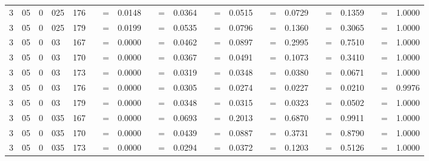 \begin{tabular*}{260mm}{r@{.}lr@{.}lc|ccc:ccc:ccc:ccc:ccc|ccc}
		3&05	&	0&025	&	176	&	 &=& 0.0148 & 	 &=& 0.0364 & 	 &=& 0.0515 & 	 &=& 0.0729 & 	 &=& 0.1359 & 	 &=& 1.0000 \\ 
		3&05	&	0&025	&	179	&	 &=& 0.0199 & 	 &=& 0.0535 & 	 &=& 0.0796 & 	 &=& 0.1360 & 	 &=& 0.3065 & 	 &=& 1.0000 \\ 
		3&05	&	0&03	&	167	&	\nicefrac{}{} &=& 0.0000 & 	 &=& 0.0462 & 	 &=& 0.0897 & 	 &=& 0.2995 & 	 &=& 0.7510 & 	 &=& 1.0000 \\ 
		3&05	&	0&03	&	170	&	\nicefrac{}{} &=& 0.0000 & 	 &=& 0.0367 & 	 &=& 0.0491 & 	 &=& 0.1073 & 	 &=& 0.3410 & 	 &=& 1.0000 \\ 
		3&05	&	0&03	&	173	&	\nicefrac{}{} &=& 0.0000 & 	 &=& 0.0319 & 	 &=& 0.0348 & 	 &=& 0.0380 & 	 &=& 0.0671 & 	 &=& 1.0000 \\ 
		3&05	&	0&03	&	176	&	\nicefrac{}{} &=& 0.0000 & 	 &=& 0.0305 & 	 &=& 0.0274 & 	 &=& 0.0227 & 	 &=& 0.0210 & 	 &=& 0.9976 \\ 
		3&05	&	0&03	&	179	&	\nicefrac{}{} &=& 0.0000 & 	 &=& 0.0348 & 	 &=& 0.0315 & 	 &=& 0.0323 & 	 &=& 0.0502 & 	 &=& 1.0000 \\ 
		3&05	&	0&035	&	167	&	\nicefrac{}{} &=& 0.0000 & 	 &=& 0.0693 & 	 &=& 0.2013 & 	 &=& 0.6870 & 	 &=& 0.9911 & 	 &=& 1.0000 \\ 
		3&05	&	0&035	&	170	&	\nicefrac{}{} &=& 0.0000 & 	 &=& 0.0439 & 	 &=& 0.0887 & 	 &=& 0.3731 & 	 &=& 0.8790 & 	 &=& 1.0000 \\ 
		3&05	&	0&035	&	173	&	\nicefrac{}{} &=& 0.0000 & 	 &=& 0.0294 & 	 &=& 0.0372 & 	 &=& 0.1203 & 	 &=& 0.5126 & 	 &=& 1.0000 \\ 

\end{tabular*}
